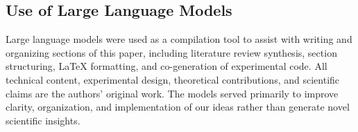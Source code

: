 \documentclass{article} %
\begin{document}

\subsection{Use of Large Language Models}
Large language models were used as a compilation tool to assist with writing and organizing sections of this
paper, including literature review synthesis, section structuring, LaTeX formatting, and co-generation of
experimental code. All technical content, experimental design, theoretical contributions, and scientific
claims are the authors' original work. The models served primarily to improve clarity, organization, and
implementation of our ideas rather than generate novel scientific insights.
\end{document}
